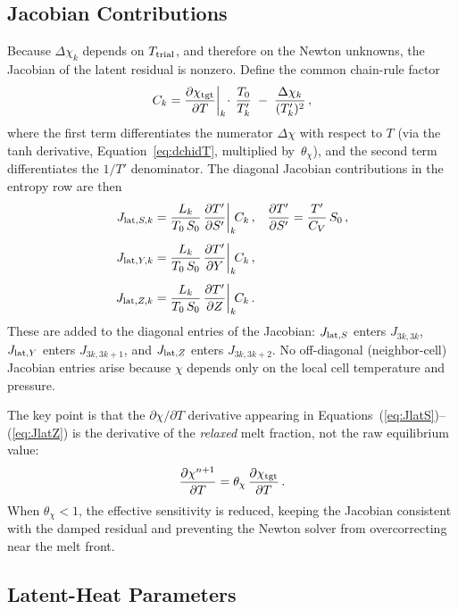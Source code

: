 \documentclass{aastex631}
\newcommand{\pp}{\partial}
\newcommand{\Cv}{C_V}
\begin{document}
\subsection{Jacobian Contributions}\label{sec:lat_jacobian}

Because $\Delta\chi_k$ depends on $T_{\rm trial}$, and therefore on
the Newton unknowns, the Jacobian of the latent residual is nonzero.
Define the common chain-rule factor
\begin{equation}\label{eq:common_lat}
  C_k
  = \frac{\pp\chi_{\rm tgt}}{\pp T}\bigg|_k
    \!\cdot\,\frac{T_0}{T'_k}
  \;-\; \frac{\Delta\chi_k}{(T'_k)^2}\,,
\end{equation}
where the first term differentiates the numerator $\Delta\chi$ with
respect to $T$ (via the tanh derivative,
Equation~\ref{eq:dchidT}, multiplied by~$\theta_\chi$), and the
second term differentiates the $1/T'$ denominator.
The diagonal Jacobian contributions in the entropy row are then
\begin{align}
  J_{{\rm lat},S,k}
    &= \frac{L_k}{T_0\,S_0}
       \,\frac{\pp T'}{\pp S'}\bigg|_k \! C_k\,,
    &\frac{\pp T'}{\pp S'}
    &= \frac{T'}{\Cv}\,S_0\,,
  \label{eq:JlatS}\\[4pt]
  J_{{\rm lat},Y,k}
    &= \frac{L_k}{T_0\,S_0}
       \,\frac{\pp T'}{\pp Y}\bigg|_k \! C_k\,,
  \label{eq:JlatY}\\[4pt]
  J_{{\rm lat},Z,k}
    &= \frac{L_k}{T_0\,S_0}
       \,\frac{\pp T'}{\pp Z}\bigg|_k \! C_k\,.
  \label{eq:JlatZ}
\end{align}
These are added to the diagonal entries of the Jacobian:
$J_{{\rm lat},S}$ enters $J_{3k,3k}$,
$J_{{\rm lat},Y}$ enters $J_{3k,3k+1}$, and
$J_{{\rm lat},Z}$ enters $J_{3k,3k+2}$.
No off-diagonal (neighbor-cell) Jacobian entries arise because $\chi$
depends only on the local cell temperature and pressure.

The key point is that the $\pp\chi/\pp T$ derivative appearing in
Equations~(\ref{eq:JlatS})--(\ref{eq:JlatZ}) is the derivative of
the \emph{relaxed} melt fraction, not the raw equilibrium value:
\begin{equation}\label{eq:dchidT_relaxed}
  \frac{\pp\chi^{n+1}}{\pp T}
  = \theta_\chi\,\frac{\pp\chi_{\rm tgt}}{\pp T}\,.
\end{equation}
When $\theta_\chi < 1$, the effective sensitivity is reduced, keeping
the Jacobian consistent with the damped residual and preventing the
Newton solver from overcorrecting near the melt front.

\subsection{Latent-Heat Parameters}
\end{document}
